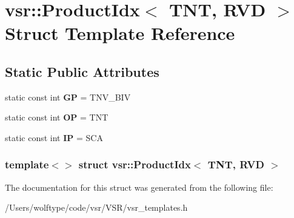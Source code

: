 \hypertarget{structvsr_1_1_product_idx_3_01_t_n_t_00_01_r_v_d_01_4}{\section{vsr\-:\-:Product\-Idx$<$ T\-N\-T, R\-V\-D $>$ Struct Template Reference}
\label{structvsr_1_1_product_idx_3_01_t_n_t_00_01_r_v_d_01_4}
}
\subsection*{Static Public Attributes}
\begin{DoxyCompactItemize}
\item 
\hypertarget{structvsr_1_1_product_idx_3_01_t_n_t_00_01_r_v_d_01_4_ab96d601fa2d2088c89b172f5e7d3a2e1}{static const int {\bfseries G\-P} = T\-N\-V\-\_\-\-B\-I\-V}\label{structvsr_1_1_product_idx_3_01_t_n_t_00_01_r_v_d_01_4_ab96d601fa2d2088c89b172f5e7d3a2e1}

\item 
\hypertarget{structvsr_1_1_product_idx_3_01_t_n_t_00_01_r_v_d_01_4_ad0d58097ec5c749d65fce10f4357903e}{static const int {\bfseries O\-P} = T\-N\-T}\label{structvsr_1_1_product_idx_3_01_t_n_t_00_01_r_v_d_01_4_ad0d58097ec5c749d65fce10f4357903e}

\item 
\hypertarget{structvsr_1_1_product_idx_3_01_t_n_t_00_01_r_v_d_01_4_a56ea8d056a796e4f2cbc8656c72e148c}{static const int {\bfseries I\-P} = S\-C\-A}\label{structvsr_1_1_product_idx_3_01_t_n_t_00_01_r_v_d_01_4_a56ea8d056a796e4f2cbc8656c72e148c}

\end{DoxyCompactItemize}
\subsubsection*{template$<$$>$ struct vsr\-::\-Product\-Idx$<$ T\-N\-T, R\-V\-D $>$}



The documentation for this struct was generated from the following file\-:\begin{DoxyCompactItemize}
\item 
/\-Users/wolftype/code/vsr/\-V\-S\-R/vsr\-\_\-templates.\-h\end{DoxyCompactItemize}
